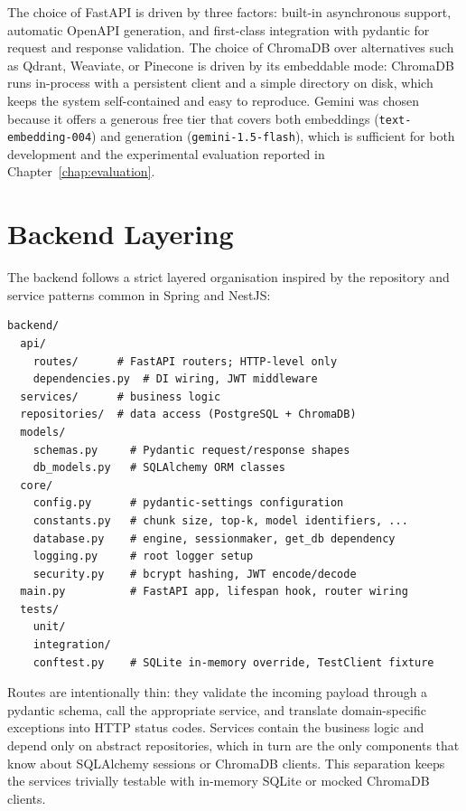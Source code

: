 The choice of FastAPI is driven by three factors: built-in asynchronous
support, automatic OpenAPI generation, and first-class integration with
pydantic for request and response validation. The choice of ChromaDB over
alternatives such as Qdrant, Weaviate, or Pinecone is driven by its
embeddable mode: ChromaDB runs in-process with a persistent client and a
simple directory on disk, which keeps the system self-contained and easy to
reproduce. Gemini was chosen because it offers a generous free tier that
covers both embeddings (\texttt{text-embedding-004}) and generation
(\texttt{gemini-1.5-flash}), which is sufficient for both development and
the experimental evaluation reported in Chapter~\ref{chap:evaluation}.

\section{Backend Layering}
\label{sec:backend-layering}

The backend follows a strict layered organisation inspired by the
repository and service patterns common in Spring and NestJS:

\begin{verbatim}
backend/
  api/
    routes/      # FastAPI routers; HTTP-level only
    dependencies.py  # DI wiring, JWT middleware
  services/      # business logic
  repositories/  # data access (PostgreSQL + ChromaDB)
  models/
    schemas.py     # Pydantic request/response shapes
    db_models.py   # SQLAlchemy ORM classes
  core/
    config.py      # pydantic-settings configuration
    constants.py   # chunk size, top-k, model identifiers, ...
    database.py    # engine, sessionmaker, get_db dependency
    logging.py     # root logger setup
    security.py    # bcrypt hashing, JWT encode/decode
  main.py          # FastAPI app, lifespan hook, router wiring
  tests/
    unit/
    integration/
    conftest.py    # SQLite in-memory override, TestClient fixture
\end{verbatim}

Routes are intentionally thin: they validate the incoming payload through
a pydantic schema, call the appropriate service, and translate
domain-specific exceptions into HTTP status codes. Services contain the
business logic and depend only on abstract repositories, which in turn are
the only components that know about SQLAlchemy sessions or ChromaDB
clients. This separation keeps the services trivially testable with
in-memory SQLite or mocked ChromaDB clients.

